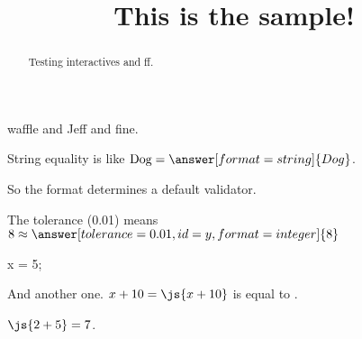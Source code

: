 \documentclass{ximera}
\title{This is the sample!}
\begin{document}
\begin{abstract}
Testing interactives and ff.
\end{abstract}

\maketitle

waffle and Jeff and fine.


\begin{problem}
  String equality is like $\mbox{Dog} = \answer[format=string]{Dog}$.

  So the format determines a default validator.
\end{problem}

\begin{problem}
  The tolerance (0.01) means $8 \approx \answer[tolerance=0.01,id=y,format=integer]{8}$
  
  \begin{feedback}[72]
  \end{feedback}
\end{problem}

\begin{javascript}
x = 5;
\end{javascript}

And another one.  $x + 10 = \js{x+10}$ is equal to .

$\js{2+5} = 7$.
\end{document}
